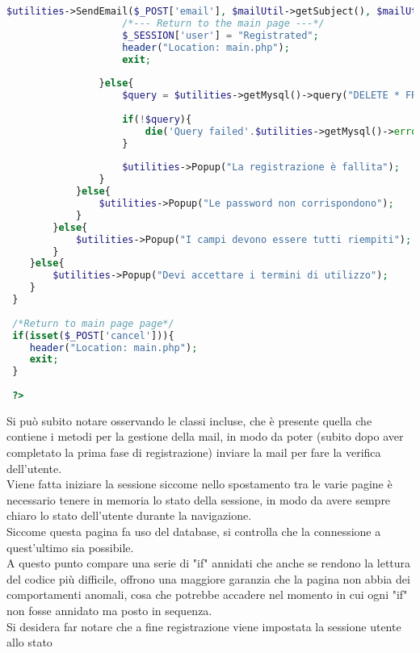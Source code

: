 \begin{lstlisting}[language=php]
 					$utilities->SendEmail($_POST['email'], $mailUtil->getSubject(), $mailUtil->getBody($URLToSend), $mailUtil->getAlternativeBody($URLToSend));
 					/*--- Return to the main page ---*/
 					$_SESSION['user'] = "Registrated";
 					header("Location: main.php");
 					exit;
 					
 				}else{
 					$query = $utilities->getMysql()->query("DELETE * FROM usert_table1 WHERE (email = '{$email}')");
 					
 					if(!$query){
 						die('Query failed'.$utilities->getMysql()->error);
 					} 
 					
 					$utilities->Popup("La registrazione è fallita");
 				}
 			}else{
 				$utilities->Popup("Le password non corrispondono");
 			}
 		}else{
 			$utilities->Popup("I campi devono essere tutti riempiti");
 		}
 	}else{
 		$utilities->Popup("Devi accettare i termini di utilizzo");
 	}
 }
 
 /*Return to main page page*/
 if(isset($_POST['cancel'])){
 	header("Location: main.php");
 	exit;
 }
 
 ?>
 \end{lstlisting}
 
 Si può subito notare osservando le classi incluse, che è presente quella che contiene i metodi per la gestione della mail, in modo da poter (subito dopo aver completato la prima fase di registrazione) inviare la mail per fare la verifica dell'utente.\\
 Viene fatta iniziare la sessione siccome nello spostamento tra le varie pagine è necessario tenere in memoria lo stato della sessione, in modo da avere sempre chiaro lo stato dell'utente durante la navigazione.\\
 Siccome questa pagina fa uso del database, si controlla che la connessione a quest'ultimo sia possibile.\\
 A questo punto compare una serie di "if" annidati che anche se rendono la lettura del codice più difficile, offrono una maggiore garanzia che la pagina non abbia dei comportamenti anomali, cosa che potrebbe accadere nel momento in cui ogni "if" non fosse annidato ma posto in sequenza.\\
 Si desidera far notare che a fine registrazione viene impostata la sessione utente allo stato 